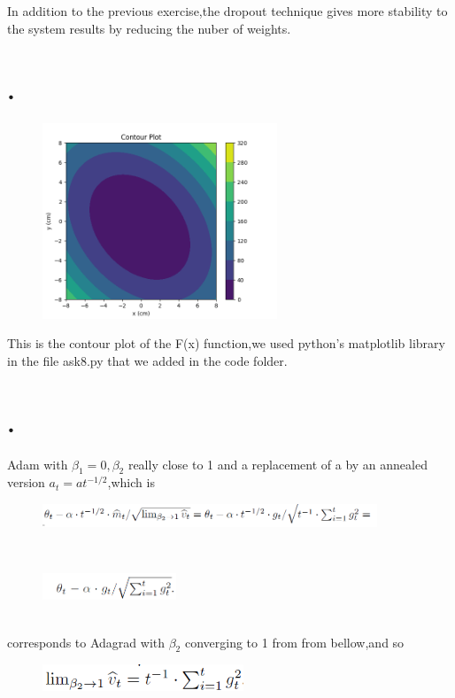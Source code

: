 \documentclass{article}
\begin{document}
In addition to the previous exercise,the dropout technique gives more stability to the system results by reducing the nuber of weights. 
\newpage
\section{.}
\begin{figure}[htp]
    \centering
    \includegraphics[width=7cm]{photos/8_contour.png}
    \label{fig:2}
\end{figure}
This is the contour plot of the F(x) function,we used python's matplotlib library in the file ask8.py that we added in the code folder.
\newpage
\section{.}
Adam with $\beta_1=0,\beta_2$ really close to 1 and a replacement of a by an annealed version $a_t=at^{-1/2}$,which is \\
\begin{figure}[htp]
    \centering
    \includegraphics[width=10cm]{photos/1st_adam.png}
    \label{fig:2}
\end{figure}\\
\begin{figure}[htp]
    \centering
    \includegraphics[width=4cm]{photos/2nd_adam.png}
    \label{fig:2}
\end{figure}\\
corresponds to Adagrad with $\beta_2$ converging to 1 from from bellow,and so 
\begin{figure}[htp]
    \centering
    \includegraphics[width=6cm]{photos/2nd_adagrad.png}
    \label{fig:2}
\end{figure}\\
\newpage
\end{document}
